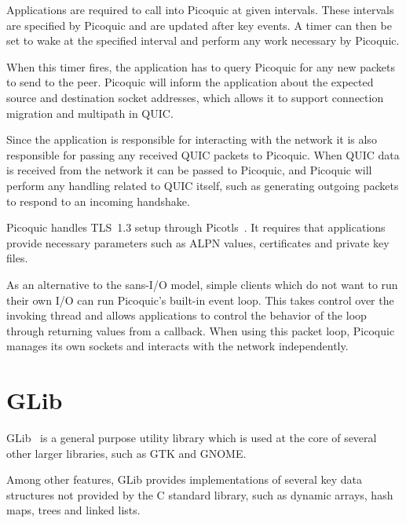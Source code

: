 Applications are required to
call into Picoquic at given intervals. These intervals
are specified by Picoquic and are updated after key
events. A timer
can then be set to wake at the specified interval
and perform any work necessary by Picoquic.

When this timer fires, the application has to query
Picoquic for any new packets to send to the peer.
Picoquic will inform the application about the
expected source and destination socket addresses,
which allows it to support connection migration and
multipath in QUIC.

Since the application is responsible for interacting
with the network it is also responsible for passing any
received QUIC packets to Picoquic. When QUIC data is
received from the network it can be passed to Picoquic,
and Picoquic will perform any handling related
to QUIC itself, such as generating outgoing packets to respond
to an incoming handshake.

Picoquic handles TLS~1.3 setup through Picotls~\cite{picotls}.
It requires that applications
provide necessary parameters such as
ALPN values, certificates and private key files.

As an alternative to the sans-I/O model,
simple clients which do not want to run their own I/O
can run Picoquic's built-in event loop. This takes
control over the invoking thread and allows applications to
control the behavior of the loop through returning values
from a callback. When using this packet loop, Picoquic
manages its own sockets and interacts with the network
independently.

\section{GLib}
GLib~\cite{GLibGitLab} is a general purpose utility library which
is used at the core of several other larger libraries, such as GTK and GNOME.

Among other features, GLib provides implementations of several key data
structures not provided by the C standard library, such as dynamic arrays,
hash maps, trees and linked lists.
